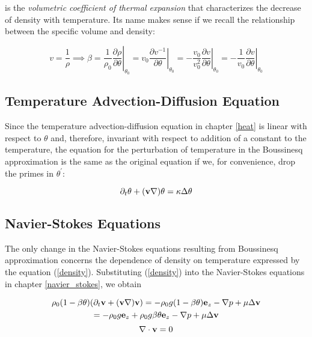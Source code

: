 is the \emph{volumetric coefficient of thermal expansion} that characterizes the decrease of density with temperature. Its name makes sense if we recall the relationship between the specific volume and density:

$$ v = \frac{1}{\rho} \implies \beta = \left. \frac{1}{\rho_0}\frac{\partial \rho}{\partial \theta} \right|_{\theta_0} = \left. v_0 \frac{\partial v^{-1}}{\partial \theta} \right|_{\theta_0} = \left. -\frac{v_0}{v_0^2} \frac{\partial v}{\partial \theta} \right|_{\theta_0} = \left. -\frac{1}{v_0} \frac{\partial v}{\partial \theta} \right|_{\theta_0} $$

\subsection{Temperature Advection-Diffusion Equation}

Since the temperature advection-diffusion equation in chapter \ref{heat} is linear with respect to $\theta$ and, therefore, invariant with respect to addition of a constant to the temperature, the equation for the perturbation of temperature in the Boussinesq approximation is the same as the original equation if we, for convenience, drop the primes in $\theta^{\prime}$:

\begin{equation} \label{heat_eq}
\partial_t\theta + (\mathbf{v}\nabla)\theta = \kappa \Delta\theta 
\end{equation}

\subsection{Navier-Stokes Equations}

The only change in the Navier-Stokes equations resulting from Boussinesq approximation concerns the dependence of density on temperature expressed by the equation (\ref{density}). Substituting (\ref{density}) into the Navier-Stokes equations in chapter \ref{navier_stokes}, we obtain

\begin{multline} \label{NS1-Poisson_boussinesq}
\rho_0(1 - \beta\theta) (\partial_t\mathbf{v} + (\mathbf{v}\nabla)\mathbf{v}) = -\rho_0 g(1 - \beta\theta)\mathbf{e}_z - \nabla p + \mu\Delta\mathbf{v} \\ = -\rho_0 g\mathbf{e}_z + \rho_0 g\beta\theta \mathbf{e}_z - \nabla p + \mu \Delta\mathbf{v}
\end{multline}
\begin{equation} \label{NS2-Poisson_boussinesq}
\nabla\cdot \mathbf{v} = 0
\end{equation}

